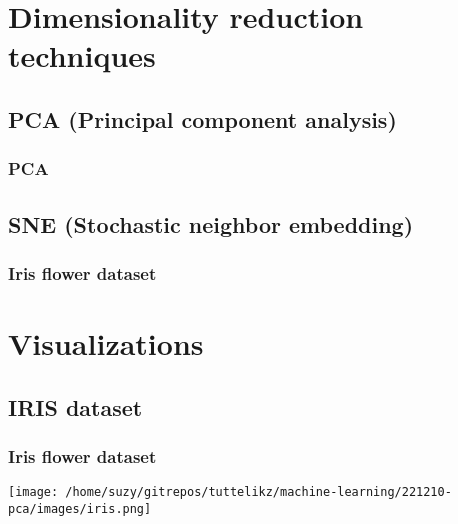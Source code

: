 \documentclass{beamer}
\begin{document}
    \section{Dimensionality reduction techniques}
    \subsection{PCA (Principal component analysis)}
    \begin{frame}
        \frametitle{PCA}
        \begin{center}
        \end{center}
    \end{frame}

    \subsection{SNE (Stochastic neighbor embedding)}
    \begin{frame}
        \frametitle{Iris flower dataset}
        \begin{center}
        \end{center}
    \end{frame}

    
    \section{Visualizations}
    \subsection{IRIS dataset}
    \begin{frame}
        \frametitle{Iris flower dataset}
        \begin{center}
        \texttt{[image: /home/suzy/gitrepos/tuttelikz/machine-learning/221210-pca/images/iris.png]}
        \end{center}
    \end{frame}
    
\end{document}
